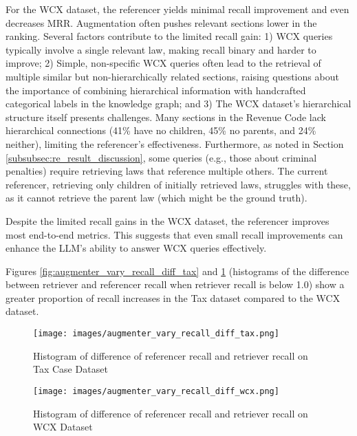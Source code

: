 For the WCX dataset, the referencer yields minimal recall improvement and even decreases MRR. Augmentation often pushes relevant sections lower in the ranking. Several factors contribute to the limited recall gain: 1) WCX queries typically involve a single relevant law, making recall binary and harder to improve; 2) Simple, non-specific WCX queries often lead to the retrieval of multiple similar but non-hierarchically related sections, raising questions about the importance of combining hierarchical information with handcrafted categorical labels in the knowledge graph; and 3) The WCX dataset's hierarchical structure itself presents challenges. Many sections in the Revenue Code lack hierarchical connections (41\% have no children, 45\% no parents, and 24\% neither), limiting the referencer's effectiveness. Furthermore, as noted in Section \ref{subsubsec:re_result_discussion}, some queries (e.g., those about criminal penalties) require retrieving laws that reference multiple others. The current referencer, retrieving only children of initially retrieved laws, struggles with these, as it cannot retrieve the parent law (which might be the ground truth).

Despite the limited recall gains in the WCX dataset, the referencer improves most end-to-end metrics. This suggests that even small recall improvements can enhance the LLM's ability to answer WCX queries effectively.

Figures \ref{fig:augmenter_vary_recall_diff_tax} and \ref{fig:augmenter_vary_recall_diff_wcx} (histograms of the difference between retriever and referencer recall when retriever recall is below 1.0) show a greater proportion of recall increases in the Tax dataset compared to the WCX dataset.

\begin{figure}[H]
\centering
\begin{minipage}{0.48\textwidth}
    \centering
    \texttt{[image: images/augmenter\_vary\_recall\_diff\_tax.png]}  %
    \caption{Histogram of difference of referencer recall and retriever recall on Tax Case Dataset}
    \label{fig:augmenter_vary_recall_diff_tax}
\end{minipage}
\hfill
\begin{minipage}{0.48\textwidth}
    \centering
    \texttt{[image: images/augmenter\_vary\_recall\_diff\_wcx.png]}  %
    \caption{Histogram of difference of referencer recall and retriever recall on WCX Dataset}
    \label{fig:augmenter_vary_recall_diff_wcx}
\end{minipage}
\end{figure}

